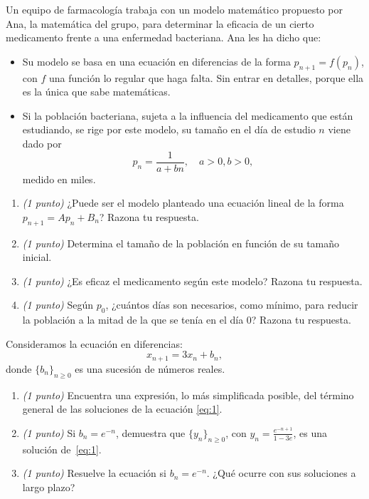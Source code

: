 \documentclass[12pt]{article}
\begin{document}
    \begin{ejercicio}
        Un equipo de farmacología trabaja con un modelo matemático propuesto por Ana, la matemática del grupo, para determinar la eficacia de un cierto medicamento frente a una enfermedad bacteriana. Ana les ha dicho que:
        
        \begin{itemize}
        \item Su modelo se basa en una ecuación en diferencias de la forma $p_{n+1} = f(p_n)$, con $f$ una función lo regular que haga falta. Sin entrar en detalles, porque ella es la única que sabe matemáticas.
        
        \item Si la población bacteriana, sujeta a la influencia del medicamento que están estudiando, se rige por este modelo, su tamaño en el día de estudio $n$ viene dado por
            $$ p_n = \frac{1}{a + bn}, \quad a > 0, b > 0, $$
            medido en miles.
        \end{itemize}
        
        \begin{enumerate}
            \item \emph{(1 punto)} ¿Puede ser el modelo planteado una ecuación lineal de la forma $p_{n+1} = Ap_n + B_n$? Razona tu respuesta.
            \item \emph{(1 punto)} Determina el tamaño de la población en función de su tamaño inicial.
            \item \emph{(1 punto)} ¿Es eficaz el medicamento según este modelo? Razona tu respuesta.
            \item \emph{(1 punto)} Según $p_0$, ¿cuántos días son necesarios, como mínimo, para reducir la población a la mitad de la que se tenía en el día 0? Razona tu respuesta.
        \end{enumerate}
    \end{ejercicio}

    \begin{ejercicio}
        Consideramos la ecuación en diferencias:
        \begin{equation}\label{eq:1}
        x_{n+1} = 3x_n + b_n,
        \end{equation}
        donde $\{b_n\}_{n \ge 0}$ es una sucesión de números reales.
    
        \begin{enumerate}
            \item \emph{(1 punto)} Encuentra una expresión, lo más simplificada posible, del término general de las soluciones de la ecuación \eqref{eq:1}.
            \item \emph{(1 punto)} Si $b_n = e^{-n}$, demuestra que $\{y_n\}_{n \ge 0}$, con $y_n = \displaystyle \frac{e^{-n+1}}{1-3e}$, es una solución de~\eqref{eq:1}.
            \item \emph{(1 punto)} Resuelve la ecuación si $b_n = e^{-n}$. ¿Qué ocurre con sus soluciones a largo plazo?
        \end{enumerate}
    \end{ejercicio}
\end{document}

